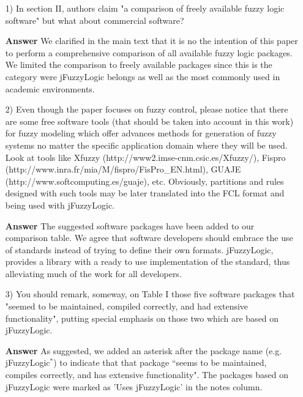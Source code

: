 \documentclass[10pt,a4paper]{article}
\begin{document}
\begin{itemize}

   \item[1)] In section II, authors claim "a comparison of freely available fuzzy logic
   software" but what about commercial software?

	\item[\textbf{Answer}] We clarified in the main text that it is no the intention of this paper to perform a comprehensive comparison of all available fuzzy logic packages. We limited the comparison 
	to freely available packages since this is the category were jFuzzyLogic belongs 
	as well as the most commonly used in academic environments.

   \item[2)] Even though the paper focuses on fuzzy control, please notice that there are
   some free software tools (that should be taken into account in this work) for
   fuzzy modeling which offer advances methods for generation of fuzzy systems no
   matter the specific application domain where they will be used. Look at tools
   like Xfuzzy (http://www2.imse-cnm.csic.es/Xfuzzy/), Fispro
   (http://www.inra.fr/mia/M/fispro/FisPro\_EN.html), GUAJE
   (http://www.softcomputing.es/guaje), etc. Obviously, partitions and rules
   designed with such tools may be later translated into the FCL format and being
   used with jFuzzyLogic.

	\item[\textbf{Answer}] The suggested software packages have been added to our comparison table. 
	We agree that software developers should embrace the use of standards instead of trying to define their own formats. 
	jFuzzyLogic, provides a library with a ready to use implementation of the standard, thus alleviating much of the work for all developers.

   \item[3)] You should remark, someway, on Table I those five software packages that
   "seemed to be maintained, compiled correctly, and had extensive functionality",
   putting special emphasis on those two which are based on jFuzzyLogic.

	\item[\textbf{Answer}] As suggested, we added an asterisk after the package name (e.g. jFuzzyLogic$^\ast$) to indicate that that package ``seems to be maintained, compiles correctly, and has extensive functionality". The packages based on jFuzzyLogic were marked as 'Uses jFuzzyLogic' in the notes column.


\end{itemize}
\end{document}
